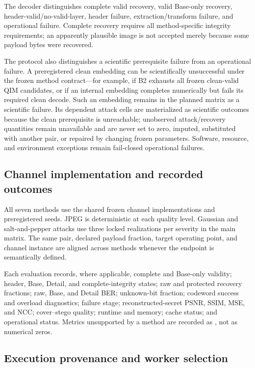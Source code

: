 The decoder distinguishes complete valid recovery, valid Base-only recovery, header-valid/no-valid-layer, header failure, extraction/transform failure, and operational failure. Complete recovery requires all method-specific integrity requirements; an apparently plausible image is not accepted merely because some payload bytes were recovered.

The protocol also distinguishes a scientific prerequisite failure from an operational failure. A preregistered clean embedding can be scientifically unsuccessful under the frozen method contract---for example, if B2 exhausts all frozen clean-valid QIM candidates, or if an internal embedding completes numerically but fails its required clean decode. Such an embedding remains in the planned matrix as a scientific failure. Its dependent attack cells are materialized as  scientific outcomes because the clean prerequisite is unreachable; unobserved attack/recovery quantities remain unavailable and are never set to zero, imputed, substituted with another pair, or repaired by changing frozen parameters. Software, resource, and environment exceptions remain fail-closed operational failures.

\subsection{Channel implementation and recorded outcomes}

All seven methods use the shared frozen channel implementations and preregistered seeds. JPEG is deterministic at each quality level. Gaussian and salt-and-pepper attacks use three locked realizations per severity in the main matrix. The same pair, declared payload fraction, target operating point, and channel instance are aligned across methods whenever the endpoint is semantically defined.

Each evaluation records, where applicable, complete and Base-only validity; header, Base, Detail, and complete-integrity states; raw and protected recovery fractions; raw, Base, and Detail BER; unknown-bit fraction; codeword success and overload diagnostics; failure stage; reconstructed-secret PSNR, SSIM, MSE, and NCC; cover--stego quality; runtime and memory; cache status; and operational status. Metrics unsupported by a method are recorded as , not as numerical zeros.

\subsection{Execution provenance and worker selection}

